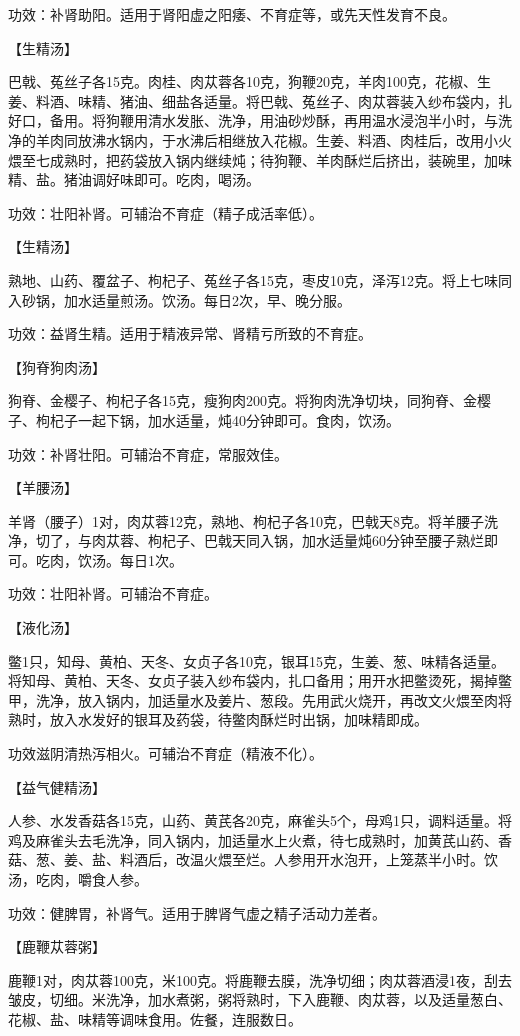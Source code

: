 \documentclass[12pt,UTF8]{ctexbook}
\begin{document}
功效：补肾助阳。适用于肾阳虚之阳痿、不育症等，或先天性发育不良。

【生精汤】

巴戟、菟丝子各15克。肉桂、肉苁蓉各10克，狗鞭20克，羊肉100克，花椒、生姜、料酒、味精、猪油、细盐各适量。将巴戟、菟丝子、肉苁蓉装入纱布袋内，扎好口，备用。将狗鞭用清水发胀、洗净，用油砂炒酥，再用温水浸泡半小时，与洗净的羊肉同放沸水锅内，于水沸后相继放入花椒。生姜、料酒、肉桂后，改用小火煨至七成熟时，把药袋放入锅内继续炖；待狗鞭、羊肉酥烂后挤出，装碗里，加味精、盐。猪油调好味即可。吃肉，喝汤。

功效：壮阳补肾。可辅治不育症（精子成活率低）。

【生精汤】

熟地、山药、覆盆子、枸杞子、菟丝子各15克，枣皮10克，泽泻12克。将上七味同入砂锅，加水适量煎汤。饮汤。每日2次，早、晚分服。

功效：益肾生精。适用于精液异常、肾精亏所致的不育症。

【狗脊狗肉汤】

狗脊、金樱子、枸杞子各15克，瘦狗肉200克。将狗肉洗净切块，同狗脊、金樱子、枸杞子一起下锅，加水适量，炖40分钟即可。食肉，饮汤。

功效：补肾壮阳。可辅治不育症，常服效佳。

【羊腰汤】

羊肾（腰子）1对，肉苁蓉12克，熟地、枸杞子各10克，巴戟天8克。将羊腰子洗净，切了，与肉苁蓉、枸杞子、巴戟天同入锅，加水适量炖60分钟至腰子熟烂即可。吃肉，饮汤。每日1次。

功效：壮阳补肾。可辅治不育症。

【液化汤】

鳖1只，知母、黄柏、天冬、女贞子各10克，银耳15克，生姜、葱、味精各适量。将知母、黄柏、天冬、女贞子装入纱布袋内，扎口备用；用开水把鳖烫死，揭掉鳖甲，洗净，放入锅内，加适量水及姜片、葱段。先用武火烧开，再改文火煨至肉将熟时，放入水发好的银耳及药袋，待鳖肉酥烂时出锅，加味精即成。

功效滋阴清热泻相火。可辅治不育症（精液不化）。

【益气健精汤】

人参、水发香菇各15克，山药、黄芪各20克，麻雀头5个，母鸡1只，调料适量。将鸡及麻雀头去毛洗净，同入锅内，加适量水上火煮，待七成熟时，加黄芪山药、香菇、葱、姜、盐、料酒后，改温火煨至烂。人参用开水泡开，上笼蒸半小时。饮汤，吃肉，嚼食人参。

功效：健脾胃，补肾气。适用于脾肾气虚之精子活动力差者。

【鹿鞭苁蓉粥】

鹿鞭1对，肉苁蓉100克，米100克。将鹿鞭去膜，洗净切细；肉苁蓉酒浸1夜，刮去皱皮，切细。米洗净，加水煮粥，粥将熟时，下入鹿鞭、肉苁蓉，以及适量葱白、花椒、盐、味精等调味食用。佐餐，连服数日。
\end{document}
